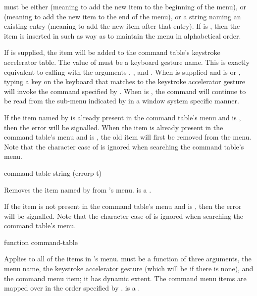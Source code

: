  must be either  (meaning to add the new item to the
beginning of the menu),  or  (meaning to add the new item to
the end of the menu), or a string naming an existing entry (meaning to add the
new item after that entry).  If  is , then the item is
inserted in such as way as to maintain the menu in alphabetical order.

If  is supplied, the item will be added to the command table's
keystroke accelerator table.  The value of  must be a keyboard
gesture name.  This is exactly equivalent to calling
 with the arguments ,
,  and .  When  is supplied
and  is  or , typing a key on the keyboard
that matches to the keystroke accelerator gesture will invoke the command
specified by .  When  is , the command will
continue to be read from the sub-menu indicated by  in a window
system specific manner.

If the item named by  is already present in the command table's menu
and  is , then the  error
will be signalled.  When the item is already present in the command table's menu
and  is , the old item will first be removed from the
menu.  Note that the character case of  is ignored when searching
the command table's menu.


 {command-table string \key (errorp t)}

Removes the item named by  from 's menu.
 is a .

If the item is not present in the command table's menu and  is
, then the  error will be signalled.  Note
that the character case of  is ignored when searching the command
table's menu.

 {function command-table}

Applies  to all of the items in 's menu.
 must be a function of three arguments, the menu name, the
keystroke accelerator gesture (which will be  if there is none), and the
command menu item; it has dynamic extent.  The command menu items are mapped
over in the order specified by .
 is a .


